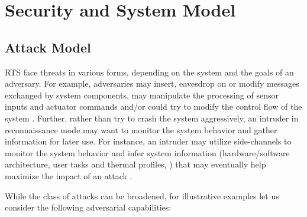 \documentclass[../rt_server_main.tex]{subfiles}
\begin{document}

\section{Security and System Model} \label{sec:system_model}

% 




\subsection{Attack Model}
\label{subsec:sec_model}


RTS face threats in various forms, depending on the system and the goals of an adversary. For example, adversaries may insert, eavesdrop on or modify messages exchanged by system components, may manipulate the processing of sensor inputs and actuator commands  and/or could try to modify the control flow of the system \cite{securecore}. Further, rather than try to crash the system aggressively, an intruder in reconnaissance mode may want to monitor the system behavior and gather information for later use. %
For instance, an intruder may utilize side-channels to monitor the system behavior and infer system information (\eg  hardware/software architecture, user tasks and thermal profiles, \etc) that may eventually help maximize the impact  of an attack \cite{cy_side_channel}.
\begin{comment}



\end{comment}
While the class of attacks can be broadened, for illustrative examples let us consider the following adversarial capabilities:
\end{document}
